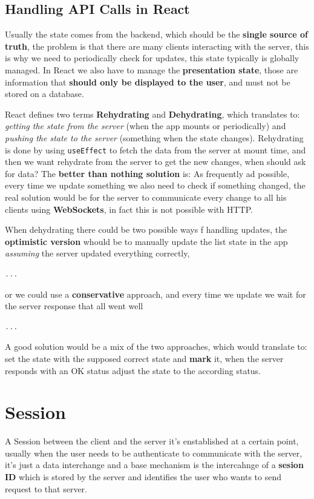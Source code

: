 \documentclass[12pt]{article}
\begin{document}
\subsection{Handling API Calls in React}
Usually the state comes from the backend, which should be the \textbf{single source of truth}, the problem is that there are many clients interacting with the server, this is why we need to periodically check for updates, this state typically is globally managed. In React we also have to manage the \textbf{presentation state}, those are information that \textbf{should only be displayed to the user}, and must not be stored on a database.

React defines two terms \textbf{Rehydrating} and \textbf{Dehydrating}, which translates to: \emph{getting the state from the server} (when the app mounts or periodically) and \emph{pushing the state to the server} (something when the state changes). Rehydrating is done by using \texttt{useEffect} to fetch the data from the server at mount time, and then we want rehydrate from the server to get the new changes, when should ask for data? The \textbf{better than nothing solution} is: As frequently ad possible, every time we update something we also need to check if something changed, the real solution would be for the server to communicate every change to all his clients using \textbf{WebSockets}, in fact this is not possible with HTTP.

When dehydrating there could be two possible ways f handling updates, the \textbf{optimistic version} whould be to manually update the list state in the app \emph{assuming} the server updated everything correctly,
\begin{lstlisting}[language=js]
...
\end{lstlisting}
or we could use a \textbf{conservative} approach, and every time we update we wait for the server response that all went well
\begin{lstlisting}[language=js]
...
\end{lstlisting}
A good solution would be a mix of the two approaches, which would translate to: set the state with the supposed correct state and \textbf{mark} it, when the server responds with an OK status adjust the state to the according status.



\section{Session}
A Session between the client and the server it's enstablished at a certain point, usually when the user needs to be authenticate to communicate with the server, it's just a data interchange and a base mechanism is the intercahnge of a \textbf{sesion ID} which is stored by the server and identifies the user who wants to send request to that server.
\end{document}
